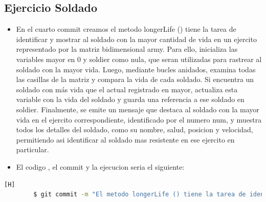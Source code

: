 \documentclass{article}
\begin{document}
	\subsection{Ejercicio Soldado}
	\begin{itemize}	
		\item En el cuarto commit creamos el metodo longerLife () tiene la tarea de identificar y mostrar al soldado con la mayor cantidad de vida en un ejercito representado por la matriz bidimensional army. Para ello, inicializa las variables mayor en 0 y soldier como nula, que seran utilizadas para rastrear al soldado con la mayor vida. Luego, mediante bucles anidados, examina todas las casillas de la matriz y compara la vida de cada soldado. Si encuentra un soldado con más vida que el actual registrado en mayor, actualiza esta variable con la vida del soldado y guarda una referencia a ese soldado en soldier. Finalmente, se emite un mensaje que destaca al soldado con la mayor vida en el ejercito correspondiente, identificado por el numero num, y muestra todos los detalles del soldado, como su nombre, salud, posicion y velocidad, permitiendo asi identificar al soldado mas resistente en ese ejercito en particular.
		\item El codigo , el commit y la ejecucion seria el siguiente:
	\end{itemize}	
	\begin{lstlisting}[language=bash,caption={Commit}][H]
		$ git commit -m "El metodo longerLife () tiene la tarea de identificar y mostrar al soldado con la mayor cantidad de vida en un ejercito representado por la matriz bidimensional army. Para ello, inicializa las variables mayor en 0 y soldier como nula, que seran utilizadas para rastrear al soldado con la mayor vida. Luego, mediante bucles anidados, examina todas las casillas de la matriz y compara la vida de cada soldado. Si encuentra un soldado con mas vida que el actual registrado en mayor, actualiza esta variable con la vida del soldado y guarda una referencia a ese soldado en soldier. Finalmente, se emite un mensaje que destaca al soldado con la mayor vida en el ejercito correspondiente, identificado por el numero num, y muestra todos los detalles del soldado, como su nombre, salud, posicion y velocidad, permitiendo asi identificar al soldado mas resistente en ese ejercito en particular."
	\end{lstlisting}	
\end{document}
